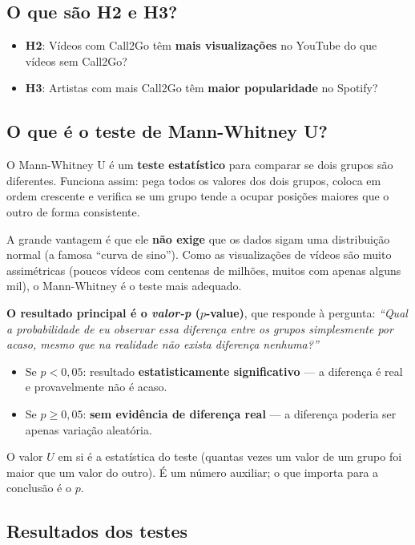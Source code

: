 \documentclass[12pt,a4paper]{article}
\newcommand{\ok}[1]{\textcolor{verde}{\textbf{#1}}}
\newcommand{\alerta}[1]{\textcolor{laranja}{\textbf{#1}}}
\newcommand{\term}[1]{\textcolor{roxo}{\textit{#1}}}
\begin{document}
\subsection{O que são H2 e H3?}

\begin{itemize}
  \item \textbf{H2}: Vídeos com Call2Go têm \textbf{mais visualizações} no
        YouTube do que vídeos sem Call2Go?
  \item \textbf{H3}: Artistas com mais Call2Go têm \textbf{maior popularidade}
        no Spotify?
\end{itemize}

\subsection{O que é o teste de Mann-Whitney U?}

O Mann-Whitney U é um \textbf{teste estatístico} para comparar se dois grupos
são diferentes. Funciona assim: pega todos os valores dos dois grupos, coloca
em ordem crescente e verifica se um grupo tende a ocupar posições maiores que
o outro de forma consistente.

A grande vantagem é que ele \textbf{não exige} que os dados sigam uma
distribuição normal (a famosa ``curva de sino''). Como as visualizações de
vídeos são muito assimétricas (poucos vídeos com centenas de milhões, muitos
com apenas alguns mil), o Mann-Whitney é o teste mais adequado.

\textbf{O resultado principal é o \term{valor-p} ($p$-value)}, que responde à
pergunta: \textit{``Qual a probabilidade de eu observar essa diferença entre
os grupos simplesmente por acaso, mesmo que na realidade não exista diferença
nenhuma?''}

\begin{itemize}
  \item Se $p < 0{,}05$: resultado \ok{estatisticamente significativo} --- a
        diferença é real e provavelmente não é acaso.
  \item Se $p \geq 0{,}05$: \alerta{sem evidência de diferença real} --- a
        diferença poderia ser apenas variação aleatória.
\end{itemize}

O valor $U$ em si é a estatística do teste (quantas vezes um valor de um
grupo foi maior que um valor do outro). É um número auxiliar; o que importa
para a conclusão é o $p$.

\subsection{Resultados dos testes}
\end{document}
